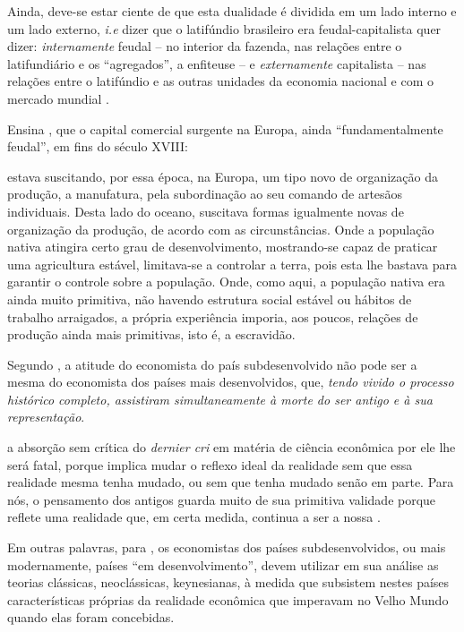 \documentclass[
	12pt,				%
	oneside,			%
	a4paper,			%
	chapter=TITLE,		%
	section=TITLE,		%
	english,			%
	brazil				%
	]{abntex2}
\begin{document}
\begin{refsection}
Ainda, deve-se estar ciente de que esta dualidade é dividida em um lado interno
e um lado externo, \emph{i.e} dizer que o latifúndio brasileiro era
feudal-capitalista quer dizer: \emph{internamente} feudal -- no interior da fazenda,
nas relações entre o latifundiário e os ``agregados'', a enfiteuse -- e
\emph{externamente} capitalista -- nas relações entre o latifúndio e as outras
unidades da economia nacional e com o mercado mundial \autocite[p.
297]{dualidade-basica}.

Ensina \textcite[p.~307-308]{dualidade-basica}, que o capital comercial surgente na
Europa, ainda ``fundamentalmente feudal'', em fins do século XVIII:
\begin{citacao}
estava suscitando, por essa época, na Europa, um tipo novo de organização da
produção, a manufatura, pela subordinação ao seu comando de artesãos
individuais. Desta lado do oceano, suscitava formas igualmente novas de
organização da produção, de acordo com as circunstâncias. Onde a população
nativa atingira certo grau de desenvolvimento, mostrando-se capaz de praticar
uma agricultura estável, limitava-se a controlar a terra, pois esta lhe bastava
para garantir o controle sobre a população. Onde, como aqui, a população nativa
era ainda muito primitiva, não havendo estrutura social estável ou hábitos de
trabalho arraigados, a própria experiência imporia, aos poucos, relações de
produção ainda mais primitivas, isto é, a escravidão.
\end{citacao}
Segundo \textcite[p.~206]{rangel1956}, a atitude do economista do país subdesenvolvido
não pode ser a mesma do economista dos países mais desenvolvidos, que, \emph{tendo
vivido o processo histórico completo, assistiram simultaneamente à morte do ser
antigo e à sua representação}.
\begin{citacao} 
a absorção sem crítica do \emph{dernier cri} em matéria de ciência econômica por
ele lhe será fatal, porque implica mudar o reflexo ideal da realidade sem que
essa realidade mesma tenha mudado, ou sem que tenha mudado senão em parte. Para
nós, o pensamento dos antigos guarda muito de sua primitiva validade porque
reflete uma realidade que, em certa medida, continua a ser a nossa
\cite[p.~206-207]{rangel1956}.
\end{citacao}
Em outras palavras, para \textcite{rangel1956}, os economistas dos países
subdesenvolvidos, ou mais modernamente, países ``em desenvolvimento'', devem
utilizar em sua análise as teorias clássicas, neoclássicas, keynesianas, à
medida que subsistem nestes países características próprias da realidade
econômica que imperavam no Velho Mundo quando elas foram concebidas.


\end{refsection}
\end{document}
